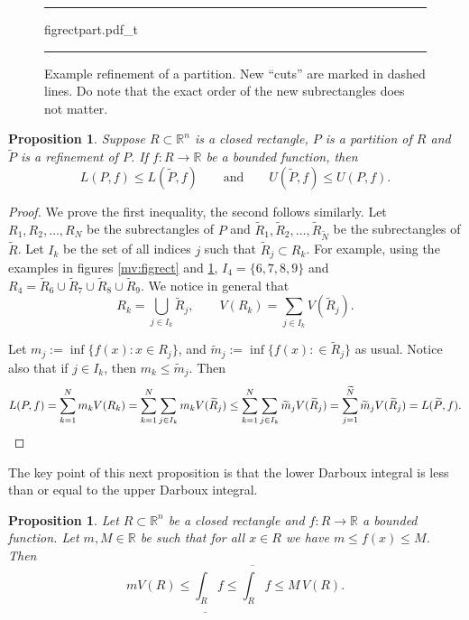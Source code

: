 \documentclass[12pt]{book}
\newenvironment{myfigureht}{%
\begin{figure}[h!t]
\noindent\rule{\textwidth}{0.4pt}\vspace{12pt}\par\centering}%
{\par\noindent\rule{\textwidth}{0.4pt}
\end{figure}}
\newcommand{\R}{{\mathbb{R}}}
\theoremstyle{plain}
\newtheorem{prop}[thm]{Proposition}
\theoremstyle{remark}
\theoremstyle{definition}
\theoremstyle{exercise}
\theoremstyle{example}
\begin{document}
\begin{myfigureht}
{figrectpart.pdf_t}
\caption{Example refinement of a partition.  New ``cuts'' are marked in
dashed lines.  Do note that the exact order of the new subrectangles does not
matter.\label{mv:figrectpart}}
\end{myfigureht}

\begin{prop} \label{mv:prop:refinement}
Suppose $R \subset \R^n$ is a closed rectangle, $P$ is a partition of $R$
and $\widetilde{P}$ is a refinement of $P$.
If $f \colon R \to \R$ be a bounded function,
then
\begin{equation*}
L(P,f) \leq L(\widetilde{P},f) 
\qquad \text{and} \qquad
U(\widetilde{P},f) \leq U(P,f) .
\end{equation*}
\end{prop}

\begin{proof}
We prove the first inequality, the second follows similarly.
Let $R_1,R_2,\ldots,R_N$ be the subrectangles of $P$
and
$\widetilde{R}_1,\widetilde{R}_2,\ldots,\widetilde{R}_{\widetilde{N}}$ be the subrectangles of
$\widetilde{R}$.
Let $I_k$ be the set of all indices $j$ such that $\widetilde{R}_j \subset R_k$.
For example, using the examples in figures \ref{mv:figrect} and
\ref{mv:figrectpart}, $I_4 = \{ 6, 7, 8, 9 \}$ and
$R_4 =
\widetilde{R}_6 \cup \widetilde{R}_7 \cup
\widetilde{R}_8 \cup \widetilde{R}_9$.
We
notice in general that
\begin{equation*}
R_k = \bigcup_{j \in I_k} \widetilde{R}_j,
\qquad
V(R_k) = \sum_{j \in I_k} V(\widetilde{R}_j).
\end{equation*}

Let $m_j := \inf \{ f(x) : x \in R_j \}$, and
$\widetilde{m}_j := \inf \{ f(x) : \in \widetilde{R}_j \}$ as usual.
Notice also that if $j \in I_k$, then $m_k \leq \widetilde{m}_j$.  Then
\begin{equation*}
L(P,f) =
\sum_{k=1}^N m_k V(R_k)
=
\sum_{k=1}^N \sum_{j\in I_k} m_k V(\widetilde{R}_j)
\leq
\sum_{k=1}^N \sum_{j\in I_k} \widetilde{m}_j V(\widetilde{R}_j)
=
\sum_{j=1}^{\widetilde{N}} \widetilde{m}_j V(\widetilde{R}_j) = L(\widetilde{P},f) . \qedhere
\end{equation*}
\end{proof}

The key point of this next proposition is that
the lower Darboux integral is less than or equal to the upper Darboux
integral.

\begin{prop} \label{mv:intulbound:prop}
Let $R \subset \R^n$ be a closed rectangle and
$f \colon R \to \R$ a bounded function.  Let $m, M \in \R$ be 
such that for all $x \in R$ we have $m \leq f(x) \leq M$.  Then
\begin{equation}
\label{mv:intulbound:eq}
m V(R) \leq
\underline{\int_R} f \leq \overline{\int_R} f
\leq M \, V(R).
\end{equation}
\end{prop}
\end{document}
